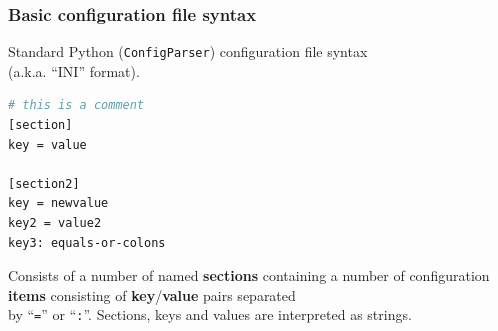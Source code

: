 \documentclass[xcolor=dvipsnames]{beamer}
\begin{document}
\begin{frame}[fragile]
  \frametitle{Basic configuration file syntax}

  Standard Python (\texttt{ConfigParser}) configuration file syntax \\
  (a.k.a. ``INI'' format).

  \begin{lstlisting}[language=bash,emph={section,section2}]
# this is a comment
[section]
key = value

[section2]
key = newvalue
key2 = value2
key3: equals-or-colons
  \end{lstlisting}

  Consists of a number of named \textbf{sections} containing a number
  of configuration \textbf{items} consisting of
  \textbf{key}/\textbf{value} pairs separated \\
  by ``\texttt{=}'' or ``\texttt{:}''.   Sections, keys and values are interpreted as strings.

\end{frame}
\end{document}
